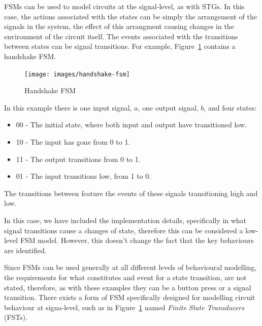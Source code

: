 FSMs can be used to model circuits at the signal-level, as with STGs. In this case, the actions associated with the states can be simply the
arrangement of the signals in the system, the effect of this arrangment causing changes in the environment of the circuit itself. The events 
associated with the transitions between states can be signal transitions. For example, Figure~\ref{fig:handshake-fsm} contains a handshake FSM.

\begin{figure}[h]
\begin{centering}
\texttt{[image: images/handshake-fsm]}
\par\end{centering}
\protect\caption{\label{fig:handshake-fsm} Handshake FSM}
\end{figure}

In this example there is one input signal, $a$, one output signal, $b$, and four states: 

\begin{itemize}

\item 00 - The initial state, where both input and output have transitioned low.

\item 10 - The input has gone from 0 to 1.

\item 11 - The output transitions from 0 to 1.

\item 01 - The input transitions low, from 1 to 0.

\end{itemize}

\noindent The transitions between feature the events of these signals transitioning high and low. 

In this case, we have included the implementation details, specifically in what signal transitions cause a changes of state, 
therefore this can be considered a low-level FSM model. However, this doesn't change the fact that the key behaviours are identified. 

Since FSMs can be used generally at all different levels of behavioural modelling, the requirements for what constitutes and event for
a state transition, are not stated, therefore, as with these examples they can be a button press or a signal transition. There exists 
a form of FSM specifically designed for modelling circuit behaviour at signa-level, such as in Figure~\ref{fig:handshake-fsm} named 
\emph{Finite State Transducers} (FSTs). 

